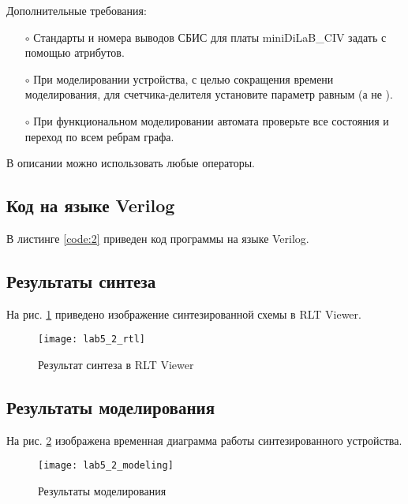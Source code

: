 Дополнительные требования:
\begin{itemize}
	\item[$\circ$] Стандарты и номера выводов СБИС для платы miniDiLaB\_CIV задать с помощью атрибутов.
	\item[$\circ$] При моделировании устройства, с целью сокращения времени моделирования, для счетчика-делителя установите параметр  равным  (а не ).
	\item[$\circ$] При функциональном моделировании автомата проверьте все состояния и переход по всем ребрам графа.
\end{itemize}

В описании можно использовать любые операторы.

\subsection{Код на языке Verilog}

В листинге \ref{code:2} приведен код программы на языке Verilog.


\vspace{-0.5cm}

\subsection{Результаты синтеза}

На рис. \ref{fig:lab5_2_rtl} приведено изображение синтезированной схемы в RLT Viewer.

\begin{figure}[H]
\begin{center}
	\texttt{[image: lab5\_2\_rtl]}
	\caption{Результат синтеза в RLT Viewer}
	\label{fig:lab5_2_rtl}
\end{center}
\end{figure}

\subsection{Результаты моделирования}
\label{sec:lab5_2_modeling}

На рис. \ref{fig:lab5_2_modeling} изображена временная диаграмма работы синтезированного устройства.

\begin{figure}[H]
\begin{center}
	\texttt{[image: lab5\_2\_modeling]}
	\caption{Результаты моделирования}
	\label{fig:lab5_2_modeling}
\end{center}
\end{figure}

